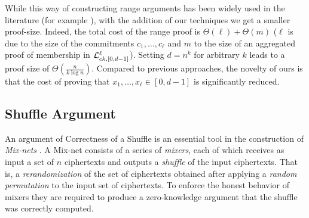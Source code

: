 While this way of constructing range arguments has been widely used in the literature (for example \cite{AC:CamChaShe08,PAIRING:RiaKohPre09}), with the addition of our techniques we get a smaller proof-size. Indeed, the total cost of the range proof is $\Theta(\ell)+\Theta(m)$ ($\ell$ is due to the size of the commitments $c_1,\ldots,c_\ell$ and $m$ to the size of an aggregated proof of membership in $\mathcal{L}_{ck,[0,d-1]}^\ell$).  Setting $d=n^{k}$ for arbitrary $k$ leads to a proof size of $\Theta(\frac{n}{k \log n})$. Compared to previous approaches, the novelty of ours is that the cost of proving that $x_1,\ldots,x_\ell\in[0,d-1]$ is significantly reduced.

\subsection{Shuffle Argument}
An argument of Correctness of a Shuffle is an essential tool in the construction of \emph{Mix-nets} \cite{CACM:Chaum81}. A Mix-net consists of a series of \emph{mixers}, each of which receives as input a set of $n$ ciphertexts and  outputs a \emph{shuffle} of the input ciphertexts. That is, a \emph{rerandomization} of the set of ciphertexts obtained after applying a \emph{random permutation} to the input set of ciphertexts. To enforce the honest behavior of mixers they are required to produce a zero-knowledge argument that the shuffle was correctly computed.  

